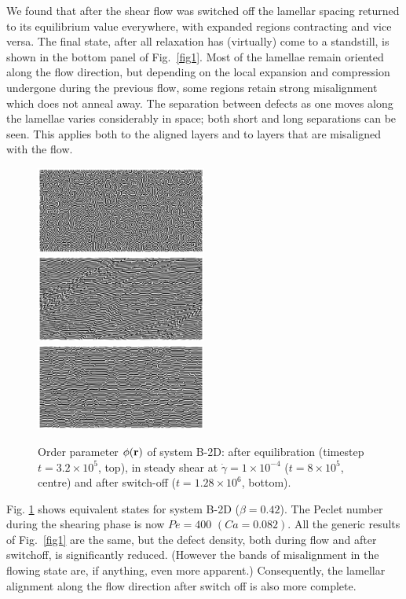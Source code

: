 \documentclass[8.5pt,twoside,twocolumn]{article}
\newcommand{\e}[1]{\times10^{#1}}
\begin{document}
We found that after the shear flow was switched off the lamellar spacing returned to its equilibrium value everywhere, with expanded regions contracting and vice versa. The final state, after all relaxation has (virtually) come to a standstill, is shown in the bottom panel of Fig.~\ref{fig1}. 
Most of the lamellae remain oriented along the flow direction, but depending on the local expansion and compression undergone during the previous flow, some regions retain strong misalignment which does not anneal away. The separation between defects as one moves along the lamellae varies considerably in space; both short and long separations can be seen. This applies both to the aligned layers and to layers that are misaligned with the flow. 

\begin{figure}[htp]
\centering
\includegraphics[angle=0,width=0.5\textwidth]{phi_run707_320.jpg}\\
\includegraphics[angle=0,width=0.5\textwidth]{phi_run710_800.jpg}\\
\includegraphics[angle=0,width=0.5\textwidth]{phi_run765_1280.jpg}
\caption{Order parameter $\phi({\bf r})$ of system B-2D: after equilibration (timestep $t=3.2\e{5}$, top), in steady shear at $\dot{\gamma}=1\times10^{-4}$ ($t=8\e{5}$, centre) and after switch-off ($t=1.28\e{6}$, bottom).}
\label{fig2}
\end{figure}

Fig. \ref{fig2} shows equivalent states for system B-2D ($\beta = 0.42$).
The Peclet number during the shearing phase is now $Pe = 400$ $(Ca = 0.082)$.
All the generic results of Fig.~\ref{fig1} are the same, but the defect density, both during flow and after switchoff, is significantly reduced. (However the bands of misalignment in the flowing state are, if anything, even more apparent.) Consequently, the lamellar alignment along the flow direction after switch off is also more complete.
\end{document}
